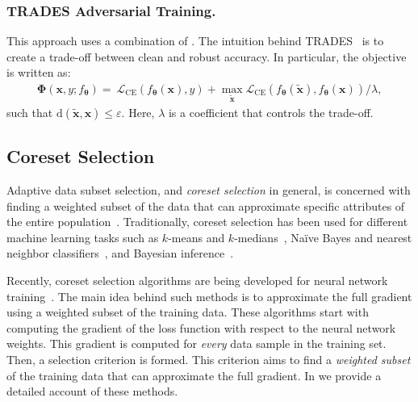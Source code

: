 \documentclass[runningheads]{llncs}
\begin{document}
\subsubsection{TRADES Adversarial Training.}
This approach uses a combination of .
The intuition behind TRADES~\cite{zhang2019trades} is to create a trade-off between clean and robust accuracy.
In particular, the objective is written as:
\begin{align}\label{eq:trades_functional}
\boldsymbol{\Phi} \left(\boldsymbol{x}, y; f_{\boldsymbol{\theta}}\right) =~ \mathcal{L}_{\mathrm{CE}}\left(f_{\boldsymbol{\theta}}(\boldsymbol{x}), y\right)
+ \max_{\tilde{\boldsymbol{x}}} \mathcal{L}_{\mathrm{CE}}\left(f_{\boldsymbol{\theta}}(\tilde{\boldsymbol{x}}), f_{\boldsymbol{\theta}}(\boldsymbol{x})\right)/\lambda, 
\end{align}
such that $\mathrm{d}({\tilde{\boldsymbol{x}}, \boldsymbol{x}})\leq \varepsilon$.
Here, $\lambda$ is a coefficient that controls the trade-off.

\subsection{Coreset Selection}\label{sec:sec:coreset_selection}
Adaptive data subset selection, and \textit{coreset selection} in general, is concerned with finding a weighted subset of the data that can approximate specific attributes of the entire population~\cite{feldman2011coresets}.
Traditionally, coreset selection has been used for different machine learning tasks such as $k$-means and $k$-medians~\cite{harpeled2004oncoresets}, Na\"{i}ve Bayes and nearest neighbor classifiers~\cite{wei2015nnc}, and Bayesian inference~\cite{campbell2018coreset}.

Recently, coreset selection algorithms are being developed for neural network training~\cite{mirzasoleiman2020craig,mirzasoleiman2020crust,killamsetty2021glister,killamsetty2021gradmatch}.
The main idea behind such methods is to approximate the full gradient using a weighted subset of the training data.
These algorithms start with computing the gradient of the loss function with respect to the neural network weights.
This gradient is computed for \textit{every} data sample in the training set.
Then, a selection criterion is formed.
This criterion aims to find a \textit{weighted subset} of the training data that can approximate the full gradient.
In  we provide a detailed account of these methods.
\end{document}
